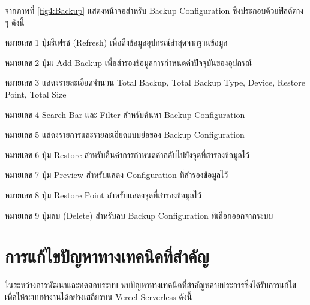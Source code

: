 \hspace*{1.3em} %

\hspace*{1.3em} %

\hspace*{1.3em} %

\hspace*{1.3em} %

\hspace*{1.3em} %

\hspace*{1.3em} %
จากภาพที่ \ref{fig4:Backup} แสดงหน้าจอสำหรับ Backup Configuration ซึ่งประกอบด้วยฟิลด์ต่าง ๆ  ดังนี้

\hspace*{1.3em} %
หมายเลข 1 ปุ่มรีเฟรช (Refresh) เพื่อดึงข้อมูลอุปกรณ์ล่าสุดจากฐานข้อมูล

\hspace*{1.3em}
หมายเลข 2 ปุ่มเ Add Backup เพื่อสำรองข้อมูลการกำหนดค่าปัจจุบันของอุปกรณ์

\hspace*{1.3em}
หมายเลข 3 แสดงรายละเอียดจำนวน Total Backup, Total Backup Type, Device, Restore Point, Total Size

\hspace*{1.3em}
หมายเลข 4 Search Bar และ Filter สำหรับค้นหา Backup Configuration 

\hspace*{1.3em}
หมายเลข 5 แสดงรายการและรายละเอียดแบบย่อของ Backup Configuration

\hspace*{1.3em}
หมายเลข 6 ปุ่ม Restore สำหรับคืนค่าการกำหนดค่ากลับไปยังจุดที่สำรองข้อมูลไว้

\hspace*{1.3em}
หมายเลข 7 ปุ่ม Preview สำหรับแสดง Configuration ที่สำรองข้อมูลไว้

\hspace*{1.3em}
หมายเลข 8 ปุ่ม Restore Point สำหรับแสดงจุดที่สำรองข้อมูลไว้

\hspace*{1.3em}
หมายเลข 9 ปุ่มลบ (Delete) สำหรับลบ Backup Configuration ที่เลือกออกจากระบบ

\section{การแก้ไขปัญหาทางเทคนิคที่สำคัญ}
\hspace*{1.3em}
ในระหว่างการพัฒนาและทดสอบระบบ พบปัญหาทางเทคนิคที่สำคัญหลายประการซึ่งได้รับการแก้ไขเพื่อให้ระบบทำงานได้อย่างเสถียรบน Vercel Serverless ดังนี้

